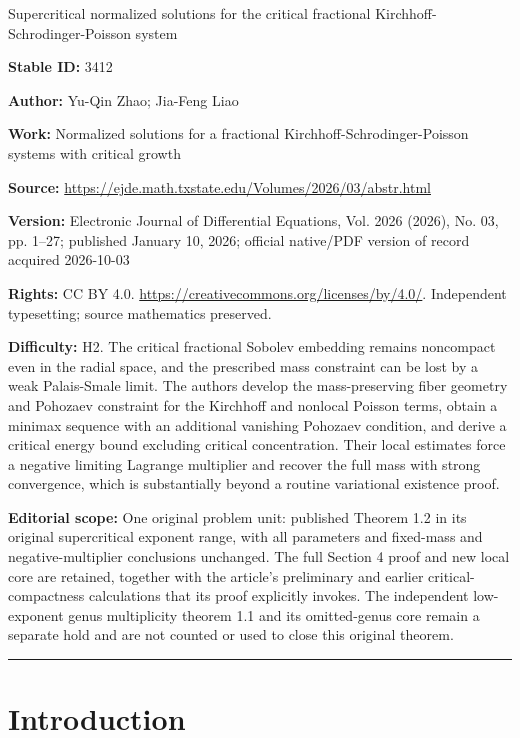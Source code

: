 \documentclass[11pt]{article}
\numberwithin{equation}{section}
\begin{document}
\begin{center}\Large Supercritical normalized solutions for the critical fractional Kirchhoff-Schrodinger-Poisson system\end{center}
\noindent\textbf{Stable ID:} 3412\par
\noindent\textbf{Author:} Yu-Qin Zhao; Jia-Feng Liao\par
\noindent\textbf{Work:} Normalized solutions for a fractional Kirchhoff-Schrodinger-Poisson systems with critical growth\par
\noindent\textbf{Source:} \url{https://ejde.math.txstate.edu/Volumes/2026/03/abstr.html}\par
\noindent\textbf{Version:} Electronic Journal of Differential Equations, Vol. 2026 (2026), No. 03, pp. 1--27; published January 10, 2026; official native/PDF version of record acquired 2026-10-03\par
\noindent\textbf{Rights:} CC BY 4.0. \url{https://creativecommons.org/licenses/by/4.0/}. Independent typesetting; source mathematics preserved.\par
\noindent\textbf{Difficulty:} H2. The critical fractional Sobolev embedding remains noncompact even in the radial space, and the prescribed mass constraint can be lost by a weak Palais-Smale limit. The authors develop the mass-preserving fiber geometry and Pohozaev constraint for the Kirchhoff and nonlocal Poisson terms, obtain a minimax sequence with an additional vanishing Pohozaev condition, and derive a critical energy bound excluding critical concentration. Their local estimates force a negative limiting Lagrange multiplier and recover the full mass with strong convergence, which is substantially beyond a routine variational existence proof.\par
\noindent\textbf{Editorial scope:} One original problem unit: published Theorem 1.2 in its original supercritical exponent range, with all parameters and fixed-mass and negative-multiplier conclusions unchanged. The full Section 4 proof and new local core are retained, together with the article's preliminary and earlier critical-compactness calculations that its proof explicitly invokes. The independent low-exponent genus multiplicity theorem 1.1 and its omitted-genus core remain a separate hold and are not counted or used to close this original theorem.\par
\medskip\hrule\medskip
\section{Introduction}
\end{document}
